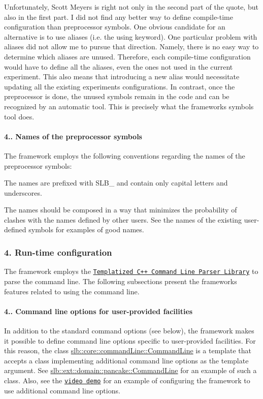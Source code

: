 Unfortunately, Scott Meyers is right not only in the second part of the quote, but also in the first part. I did not find any better way to define compile-\/time configuration than preprocessor symbols. One obvious candidate for an alternative is to use aliases (i.\+e. the {\ttfamily using} keyword). One particular problem with aliases did not allow me to pursue that direction. Namely, there is no easy way to determine which aliases are unused. Therefore, each compile-\/time configuration would have to define all the aliases, even the ones not used in the current experiment. This also means that introducing a new alias would necessitate updating all the existing experiments\textquotesingle{} configurations. In contrast, once the preprocessor is done, the unused symbols remain in the code and can be recognized by an automatic tool. This is precisely what the framework\textquotesingle{}s {\ttfamily symbols} tool does.\hypertarget{index_s-symbols-conventions}{}\paragraph{4.. Names of the preprocessor symbols}\label{index_s-symbols-conventions}
The framework employs the following conventions regarding the names of the preprocessor symbols\+:
\begin{DoxyItemize}
\item The names are prefixed with {\ttfamily S\+L\+B\+\_\+} and contain only capital letters and underscores.
\item The names should be composed in a way that minimizes the probability of clashes with the names defined by other users. See the names of the existing user-\/defined symbols for examples of good names.
\end{DoxyItemize}\hypertarget{index_s-run-config}{}\subsubsection{4. Run-\/time configuration}\label{index_s-run-config}
The framework employs the \href{http://tclap.sourceforge.net/}{\tt Templatized C++ Command Line Parser Library} to parse the command line. The following subsections present the framework\textquotesingle{}s features related to using the command line.\hypertarget{index_s-user-cmd}{}\paragraph{4.. Command line options for user-\/provided facilities}\label{index_s-user-cmd}
In addition to the standard command options (see below), the framework makes it possible to define command line options specific to user-\/provided facilities. For this reason, the class \hyperlink{structslb_1_1core_1_1commandLine_1_1CommandLine}{slb\+::core\+::command\+Line\+::\+Command\+Line} is a template that accepts a class implementing additional command line options as the template argument. See \hyperlink{structslb_1_1ext_1_1domain_1_1pancake_1_1CommandLine}{slb\+::ext\+::domain\+::pancake\+::\+Command\+Line} for an example of such a class. Also, see the \href{https://youtu.be/cElxLWve1Zw}{\tt video demo} for an example of configuring the framework to use additional command line options.

